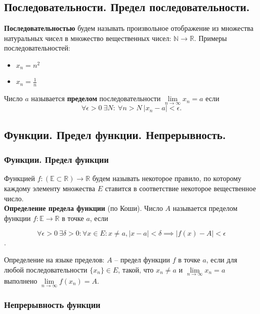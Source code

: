 \documentclass{article}
\begin{document}
\subsection{Последовательности. Предел последовательности.}

\textbf{Последовательностью} будем называть произвольное отображение из множества натуральных чисел в множество вещественных чисел: $\mathbb{N} \to \mathbb{R}$. Примеры последовательностей:

\begin{itemize}
	\item $x_n = n^2$
	\item $x_n = \frac{1}{n}$
\end{itemize}

Число $a$ называется \textbf{пределом} последовательности $\lim\limits_{n \to \infty} x_n = a$ если $$ \forall \epsilon > 0 \ \exists N :  \ \forall n > N \ |x_n - a| < \epsilon.$$

\subsection{Функции. Предел функции. Непрерывность.}

\subsubsection{Функции. Предел функции}

Функцией $f : \left(\mathbb{E} \subset \mathbb{R}\right) \to \mathbb{R}$ будем называть некоторое правило, по которому каждому элементу множества $E$ ставится в соответствие некоторое вещественное число. \\

\textbf{Определение предела функции} (по Коши). Число $A$ называется пределом функции $f : \mathbb{E} \to \mathbb{R}$ в точке $a$, если 

$$ \forall \epsilon > 0 \ \exists \delta > 0 : \forall x \in E : x \ne a, |x - a| < \delta \implies |f(x) - A| < \epsilon $$.

Определение на языке пределов: $A$ -- предел функции $f$ в точке $a$, если для любой последовательности $\{x_n\} \in E$, такой, что $x_n \ne a$ и $\lim\limits_{n \to \infty} x_n = a$ выполнено $\lim\limits_{n \to \infty} f(x_n) = A$.

\subsubsection{Непрерывность функции}
\end{document}
